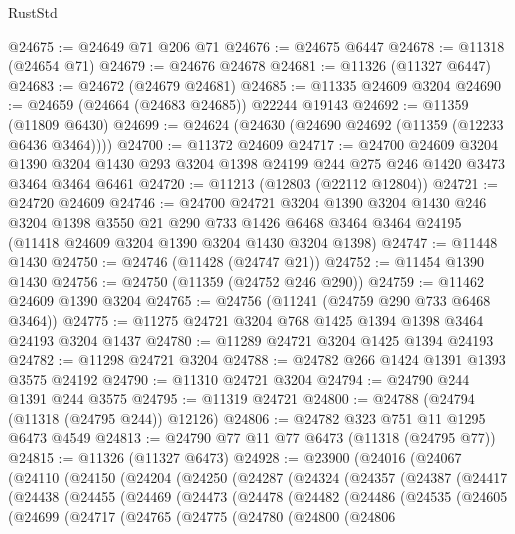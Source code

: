 \begin{lexlean}{RustStd}
\begin{coremodule}
{{{{{{{{{{{{{{{{{{{@24675 := @24649 @71 @206 @71
@24676 := @24675 @6447
@24678 := @11318 (@24654 @71)
@24679 := @24676 @24678
@24681 := @11326 (@11327 @6447)
@24683 := @24672 (@24679 @24681)
@24685 := @11335 @24609 @3204
@24690 := @24659 (@24664 (@24683 @24685)) @22244 @19143
@24692 := @11359 (@11809 @6430)
@24699 := @24624 (@24630 (@24690 @24692 (@11359 (@12233 @6436 @3464))))
@24700 := @11372 @24609
@24717 := @24700
    @24609
    @3204
    @1390
    @3204
    @1430
    @293
    @3204
    @1398
    @24199
    @244
    @275
    @246
    @1420
    @3473
    @3464
    @3464
    @6461
@24720 := @11213 (@12803 (@22112 @12804))
@24721 := @24720 @24609
@24746 := @24700
    @24721
    @3204
    @1390
    @3204
    @1430
    @246
    @3204
    @1398
    @3550
    @21
    @290
    @733
    @1426
    @6468
    @3464
    @3464
    @24195
    (@11418 @24609 @3204 @1390 @3204 @1430 @3204 @1398)
@24747 := @11448 @1430
@24750 := @24746 (@11428 (@24747 @21))
@24752 := @11454 @1390 @1430
@24756 := @24750 (@11359 (@24752 @246 @290))
@24759 := @11462 @24609 @1390 @3204
@24765 := @24756 (@11241 (@24759 @290 @733 @6468 @3464))
@24775 := @11275 @24721 @3204 @768 @1425 @1394 @1398 @3464 @24193 @3204 @1437
@24780 := @11289 @24721 @3204 @1425 @1394 @24193
@24782 := @11298 @24721 @3204
@24788 := @24782 @266 @1424 @1391 @1393 @3575 @24192
@24790 := @11310 @24721 @3204
@24794 := @24790 @244 @1391 @244 @3575
@24795 := @11319 @24721
@24800 := @24788 (@24794 (@11318 (@24795 @244)) @12126)
@24806 := @24782 @323 @751 @11 @1295 @6473 @4549
@24813 := @24790 @77 @11 @77 @6473 (@11318 (@24795 @77))
@24815 := @11326 (@11327 @6473)
@24928 := @23900
    (@24016
      (@24067
        (@24110
          (@24150
            (@24204
              (@24250
                (@24287
                  (@24324
                    (@24357
                      (@24387
                        (@24417
                          (@24438
                            (@24455
                              (@24469
                                (@24473
                                  (@24478
                                    (@24482
                                      (@24486
                                        (@24535
                                          (@24605
                                            (@24699
                                              (@24717
                                                (@24765
                                                  (@24775
                                                    (@24780
                                                      (@24800
                                                        (@24806
}}}}}}}}}}}}}}}}}}}
\end{coremodule}
\end{lexlean}

